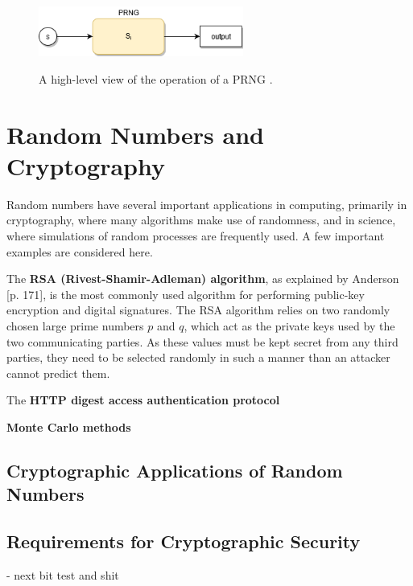\documentclass[12pt, titlepage]{report}
\theoremstyle{definition}
\begin{document}
\begin{figure}
\centering
\includegraphics[width=0.6\textwidth]{img/conceptual_prng.png}\\
\caption{A high-level view of the operation of a PRNG \cite{kelsey1998cryptanalytic}.}
\label{figure:prng_high_level}
\end{figure}




\clearpage
\section{Random Numbers and Cryptography}
Random numbers have several important applications in computing, primarily in cryptography, where many algorithms make use of randomness, \cite[p. 137]{ ferguson2010cryptography} and in science, where simulations of random processes are frequently used\cite{deng2017developments}. A few important examples are considered here.

The \textbf{RSA (Rivest-Shamir-Adleman) algorithm}, as explained by Anderson [p. 171]\cite{anderson2010security}, is the most commonly used algorithm for performing public-key encryption and digital signatures. The RSA algorithm relies on two randomly chosen large prime numbers $p$ and $q$, which act as the private keys used by the two communicating parties. As these values must be kept secret from any third parties, they need to be selected randomly in such a manner than an attacker cannot predict them.

The \textbf{HTTP digest access authentication protocol} 

\textbf{Monte Carlo methods} 


\subsection{Cryptographic Applications of Random Numbers}



\subsection{Requirements for Cryptographic Security}\label{subsection:crypto_requirements}
- next bit test and shit
\end{document}
